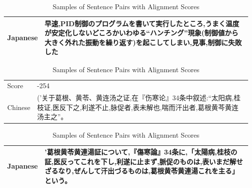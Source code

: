 \begin{table}[h]
\begin{CJK}{UTF8}{long}
        \begin{tabularx}{\textwidth}{lb}
            Japanese & 早速,PID制御のプログラムを書いて実行したところ,うまく温度が安定化しないどころかいわゆる“ハンチング”現象(制御値から大きく外れた振動を繰り返す)を起こしてしまい,見事,制御に失敗した \\
            \midrule
        \end{tabularx}
    \end{CJK}
    \begin{CJK}{UTF8}{gbsn}
        \begin{tabularx}{\textwidth}{lb}
            Score & -254 \\
            {Chinese } & ('关于葛根、黄苓、黄连汤之证,在『伤寒论』34条中叙述:“太阳病,桂枝证,医反下之,利遂不止,脉促者,表未解也,喘而汗出者,葛根黄芩黄连汤主之”。 \\
        \end{tabularx}
    \end{CJK}
    \begin{CJK}{UTF8}{long}
        \begin{tabularx}{\textwidth}{lb}
            Japanese & '葛根黄苓黄連湯証について,『傷寒論』34条に,「太陽病,桂枝の証,医反ってこれを下し,利遂に止まず,脈促のものは,表いまだ解せざるなり,ぜんして汗出づるものは,葛根黄苓黄連湯これを主る」という。 \\
            \midrule
        \end{tabularx}
    \end{CJK}
    \caption{Samples of Sentence Pairs with Alignment Scores}
    \label{tab:alignment_samples}
\end{table}







